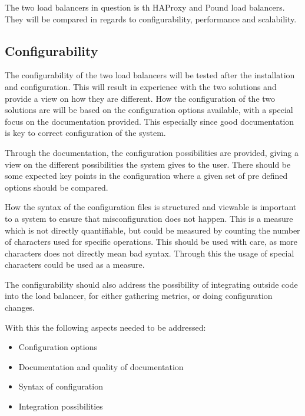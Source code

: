 The two load balancers in question is th HAProxy and Pound load balancers. They
will be compared in regards to configurability, performance and scalability. 



\subsection{Configurability}
The configurability of the two load balancers will be tested after the
installation and configuration. This will result in experience with the two
solutions and provide a view on how they are different. How the configuration
of the two solutions are will be based on the configuration options available,
with a special focus on the documentation provided. This especially since good
documentation is key to correct configuration of the system.

Through the documentation, the configuration possibilities are provided, giving a view on
the different possibilities the system gives to the user. There should be some
expected key points in the configuration where a given set of pre defined
options should be compared.

How the syntax of the configuration files is structured and viewable is
important to a system to ensure that misconfiguration does not happen. This is
a measure which is not directly quantifiable, but could be measured by counting
the number of characters used for specific operations. This should be used with
care, as more characters does not directly mean bad syntax. Through this the
usage of special characters could be used as a measure.

The configurability should also address the possibility of integrating outside
code into the load balancer, for either gathering metrics, or doing
configuration changes.

With this the following aspects needed to be addressed:
\begin{itemize}
    \item Configuration options
    \item Documentation and quality of documentation
    \item Syntax of configuration
    \item Integration possibilities
\end{itemize}

